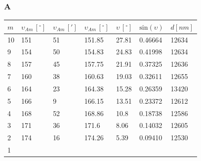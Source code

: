 \documentclass[a4paper, 11pt]{article}
\begin{document}
\subsubsection{A}\label{sec:a} %
\begin{center}
	\begin{tabular}{|l|l|l|l|l|l|l|}
		\hline
		$m $ & $\upsilon_{Am} \, [^{\circ}]$ & $\upsilon_{Am} \, [']$ & $\upsilon_{Am} \, [^{\circ}]$ & $\upsilon \, [^{\circ}]$ & $\text{sin}(\upsilon)$ & $d [nm]$ \\ \hline
		10   & 151                           & 51                     & 151.85                        & 27.81                    & 0.46664                & 12634    \\ \hline
		9    & 154                           & 50                     & 154.83                        & 24.83                    & 0.41998                & 12634    \\ \hline
		8    & 157                           & 45                     & 157.75                        & 21.91                    & 0.37325                & 12636    \\ \hline
		7    & 160                           & 38                     & 160.63                        & 19.03                    & 0.32611                & 12655    \\ \hline
		6    & 164                           & 23                     & 164.38                        & 15.28                    & 0.26359                & 13420    \\ \hline
		5    & 166                           & 9                      & 166.15                        & 13.51                    & 0.23372                & 12612    \\ \hline
		4    & 168                           & 52                     & 168.86                        & 10.8                     & 0.18738                & 12586    \\ \hline
		3    & 171                           & 36                     & 171.6                         & 8.06                     & 0.14032                & 12605    \\ \hline
		2    & 174                           & 16                     & 174.26                        & 5.39                     & 0.09410                & 12530    \\ \hline
		1    & ~                             & ~                      & ~                             & ~                        & ~                      & ~        \\ \hline

\end{tabular}
\end{center}
\end{document}
